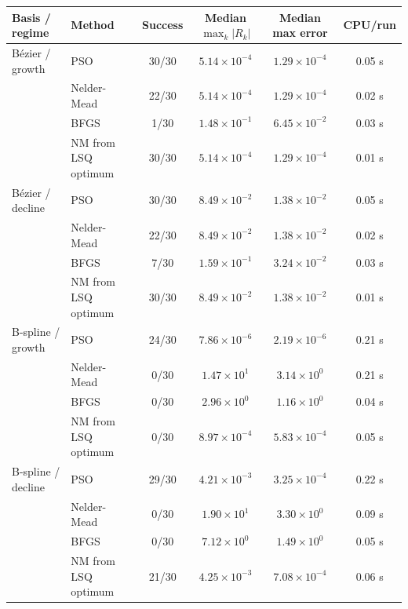 \begin{tabular}{llcccc}
\toprule
Basis / regime & Method & Success & Median $\max_k|R_k|$ & Median max error & CPU/run\\
\midrule
B\'ezier / growth & PSO & 30/30 & $5.14\times10^{-4}$ & $1.29\times10^{-4}$ & 0.05 s\\
 & Nelder-Mead & 22/30 & $5.14\times10^{-4}$ & $1.29\times10^{-4}$ & 0.02 s\\
 & BFGS & 1/30 & $1.48\times10^{-1}$ & $6.45\times10^{-2}$ & 0.03 s\\
 & NM from LSQ optimum & 30/30 & $5.14\times10^{-4}$ & $1.29\times10^{-4}$ & 0.01 s\\
\addlinespace
B\'ezier / decline & PSO & 30/30 & $8.49\times10^{-2}$ & $1.38\times10^{-2}$ & 0.05 s\\
 & Nelder-Mead & 22/30 & $8.49\times10^{-2}$ & $1.38\times10^{-2}$ & 0.02 s\\
 & BFGS & 7/30 & $1.59\times10^{-1}$ & $3.24\times10^{-2}$ & 0.03 s\\
 & NM from LSQ optimum & 30/30 & $8.49\times10^{-2}$ & $1.38\times10^{-2}$ & 0.01 s\\
\addlinespace
B-spline / growth & PSO & 24/30 & $7.86\times10^{-6}$ & $2.19\times10^{-6}$ & 0.21 s\\
 & Nelder-Mead & 0/30 & $1.47\times10^{1}$ & $3.14\times10^{0}$ & 0.21 s\\
 & BFGS & 0/30 & $2.96\times10^{0}$ & $1.16\times10^{0}$ & 0.04 s\\
 & NM from LSQ optimum & 0/30 & $8.97\times10^{-4}$ & $5.83\times10^{-4}$ & 0.05 s\\
\addlinespace
B-spline / decline & PSO & 29/30 & $4.21\times10^{-3}$ & $3.25\times10^{-4}$ & 0.22 s\\
 & Nelder-Mead & 0/30 & $1.90\times10^{1}$ & $3.30\times10^{0}$ & 0.09 s\\
 & BFGS & 0/30 & $7.12\times10^{0}$ & $1.49\times10^{0}$ & 0.05 s\\
 & NM from LSQ optimum & 21/30 & $4.25\times10^{-3}$ & $7.08\times10^{-4}$ & 0.06 s\\
\bottomrule
\end{tabular}